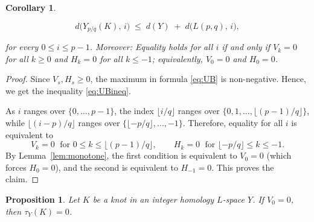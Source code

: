 \documentclass[12pt]{amsart}
\newtheorem{corollary}[theorem]{Corollary}
\newtheorem{proposition}[theorem]{Proposition}
\theoremstyle{definition}
\theoremstyle{definition}
\newcommand{\din}{d}
\begin{document}
\begin{corollary}\label{cor:UB}
    

\begin{equation}\label{eq:UBineq}
\din\big(Y_{p/q}(K),\, i\big) \;\leq\;
\din(Y) \;+\; \din\big(L(p,q),\, i\big),
\end{equation}

for every $0 \leq i \leq p-1$.  Moreover: Equality holds for all $i$ if and only if $V_k = 0$ for all $k \geq 0$
and $H_k = 0$ for all $k \leq -1$; equivalently, $V_0 = 0$ and $H_0 = 0$.

\end{corollary}

\begin{proof}
    
Since $V_s, H_s \geq 0$, the maximum in formula \eqref{eq:UB} is
non-negative. Hence, we get the inequality \eqref{eq:UBineq}.

As $i$ ranges over $\{0, \ldots, p-1\}$, the index $\lfloor i/q \rfloor$ ranges
over $\{0, 1, \ldots, \lfloor (p-1)/q \rfloor\}$, while
$\lfloor (i - p)/q \rfloor$ ranges over
$\{\lfloor -p/q \rfloor, \ldots, -1\}$.
Therefore, equality for all $i$ is equivalent to
\[
V_k = 0 \;\text{ for } 0 \leq k \leq \lfloor(p-1)/q\rfloor, \qquad
H_k = 0 \;\text{ for } \lfloor -p/q \rfloor \leq k \leq -1.
\]
By Lemma~\ref{lem:monotone}, the first condition is equivalent
to $V_0 = 0$ (which forces $H_0=0$), and the second is
equivalent to $H_{-1} = 0$.
This proves the claim.

\end{proof}
\begin{proposition}\label{prop:V0H0tau}
Let $K$ be a knot in an integer homology $L$-space $Y$. If $V_0 = 0$, then $\tau_Y(K) = 0$.
\end{proposition}
\end{document}
